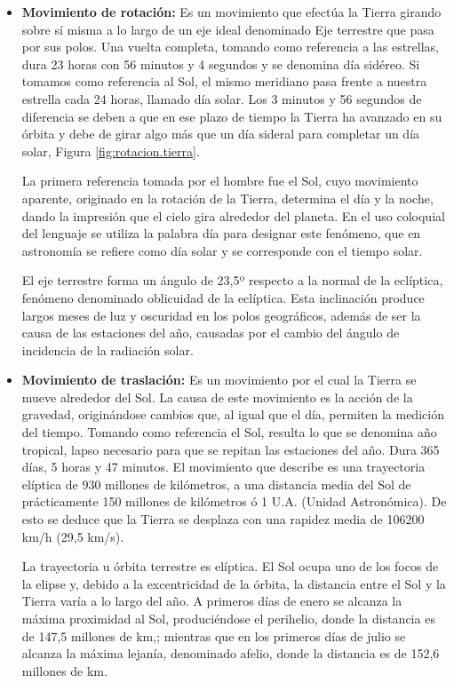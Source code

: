 \begin{itemize}
	\item \textbf{Movimiento de rotaci\'on:} Es un movimiento que efectúa la Tierra girando sobre sí misma a lo largo de un eje ideal denominado Eje terrestre que pasa por sus polos. Una vuelta completa, tomando como referencia a las estrellas, dura 23 horas con 56 minutos y 4 segundos y se denomina día sidéreo. Si tomamos como referencia al Sol, el mismo meridiano pasa frente a nuestra estrella cada 24 horas, llamado día solar. Los 3 minutos y 56 segundos de diferencia se deben a que en ese plazo de tiempo la Tierra ha avanzado en su órbita y debe de girar algo más que un día sideral para completar un día solar, Figura \ref{fig:rotacion.tierra}.

La primera referencia tomada por el hombre fue el Sol, cuyo movimiento aparente, originado en la rotación de la Tierra, determina el día y la noche, dando la impresión que el cielo gira alrededor del planeta. En el uso coloquial del lenguaje se utiliza la palabra día para designar este fenómeno, que en astronomía se refiere como día solar y se corresponde con el tiempo solar.

El eje terrestre forma un ángulo de 23,5º respecto a la normal de la eclíptica, fenómeno denominado oblicuidad de la eclíptica. Esta inclinación produce largos meses de luz y oscuridad en los polos geográficos, además de ser la causa de las estaciones del año, causadas por el cambio del ángulo de incidencia de la radiación solar.

        \item \textbf{Movimiento de traslación:} Es un movimiento por el cual la Tierra se mueve alrededor del Sol. La causa de este movimiento es la acción de la gravedad, originándose cambios que, al igual que el día, permiten la medición del tiempo. Tomando como referencia el Sol, resulta lo que se denomina año tropical, lapso necesario para que se repitan las estaciones del año. Dura 365 días, 5 horas y 47 minutos. El movimiento que describe es una trayectoria elíptica de 930 millones de kilómetros, a una distancia media del Sol de prácticamente 150 millones de kilómetros ó 1 U.A. (Unidad Astronómica). De esto se deduce que la Tierra se desplaza con una rapidez media de 106200 km/h (29,5 km/s).

La trayectoria u órbita terrestre es elíptica. El Sol ocupa uno de los focos de la elipse y, debido a la excentricidad de la órbita, la distancia entre el Sol y la Tierra varía a lo largo del año. A primeros días de enero se alcanza la máxima proximidad al Sol, produciéndose el perihelio, donde la distancia es de 147,5 millones de km,; mientras que en los primeros días de julio se alcanza la máxima lejanía, denominado afelio, donde la distancia es de 152,6 millones de km.


\end{itemize}

